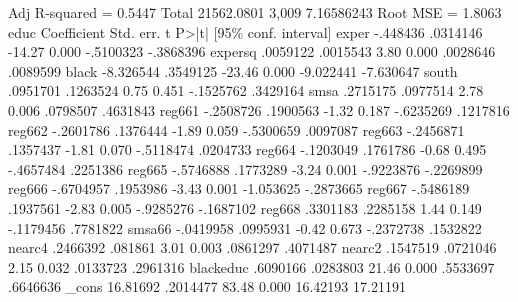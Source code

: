    Adj R-squared   =    0.5447
       Total {\VBAR}  21562.0801     3,009  7.16586243   Root MSE        =    1.8063
{\smallskip}
        educ {\VBAR} Coefficient  Std. err.      t    P>|t|     [95\% conf. interval]
       exper {\VBAR}   -.448436   .0314146   -14.27   0.000    -.5100323   -.3868396
     expersq {\VBAR}   .0059122   .0015543     3.80   0.000     .0028646    .0089599
       black {\VBAR}  -8.326544   .3549125   -23.46   0.000    -9.022441   -7.630647
       south {\VBAR}   .0951701   .1263524     0.75   0.451    -.1525762    .3429164
        smsa {\VBAR}   .2715175   .0977514     2.78   0.006     .0798507    .4631843
      reg661 {\VBAR}  -.2508726   .1900563    -1.32   0.187    -.6235269    .1217816
      reg662 {\VBAR}  -.2601786   .1376444    -1.89   0.059    -.5300659    .0097087
      reg663 {\VBAR}  -.2456871   .1357437    -1.81   0.070    -.5118474    .0204733
      reg664 {\VBAR}  -.1203049   .1761786    -0.68   0.495    -.4657484    .2251386
      reg665 {\VBAR}  -.5746888   .1773289    -3.24   0.001    -.9223876   -.2269899
      reg666 {\VBAR}  -.6704957   .1953986    -3.43   0.001    -1.053625   -.2873665
      reg667 {\VBAR}  -.5486189   .1937561    -2.83   0.005    -.9285276   -.1687102
      reg668 {\VBAR}   .3301183   .2285158     1.44   0.149    -.1179456    .7781822
      smsa66 {\VBAR}  -.0419958   .0995931    -0.42   0.673    -.2372738    .1532822
      nearc4 {\VBAR}   .2466392    .081861     3.01   0.003     .0861297    .4071487
      nearc2 {\VBAR}   .1547519   .0721046     2.15   0.032     .0133723    .2961316
   blackeduc {\VBAR}   .6090166   .0283803    21.46   0.000     .5533697    .6646636
       _cons {\VBAR}   16.81692   .2014477    83.48   0.000     16.42193    17.21191
{\smallskip}
